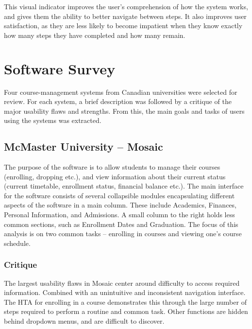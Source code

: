 \documentclass[10pt]{article}
\newenvironment{InlineColumnFigure}
{\par\medskip\noindent\minipage{\linewidth}}
{\endminipage\par\medskip}
\newcommand{\Caption}[1]
{\vspace{-4mm}\fontsize{9}{9}\textbf{Figure \refstepcounter{figCounter} 
\arabic{figCounter}: #1}}
\newcounter{figCounter}
\begin{document}
\begin{multicols}{2}
This visual indicator improves the user's comprehension of how the system 
works, and gives them the ability to better navigate between steps. It also improves user satisfaction, 
as they are less likely to become impatient when they know exactly 
how many steps they have completed and how many remain. 

\section*{Software Survey}
Four course-management systems from Canadian universities were selected for 
review. For each system, a brief description was followed by a critique of 
the major usability flaws and strengths. From this, the main goals and tasks of 
users using the systems was extracted. 


\subsection*{McMaster University -- Mosaic}
The purpose of the software is to allow students to manage their courses 
(enrolling, dropping etc.), and view information about their current status 
(current timetable, enrollment status, financial balance etc.). The main 
interface for the software consists of several collapsible modules 
encapsulating different aspects of the software in a main column. These include 
Academics, Finances, Personal Information, and Admissions. A small column to 
the right holds less common sections, such as Enrollment Dates and Graduation. 
The focus of this analysis is on two common tasks -- enrolling in courses and 
viewing one's course schedule.


\subsubsection*{Critique}
The largest usability flaws in Mosaic center around difficulty to access 
required information. Combined with an unintuitive and inconsistent navigation 
interface. The HTA for enrolling in a course demonstrates this 
through the large number of steps required to perform a routine and common task. 
Other functions are hidden behind dropdown menus, and are difficult to discover.



\end{multicols}
\end{document}
